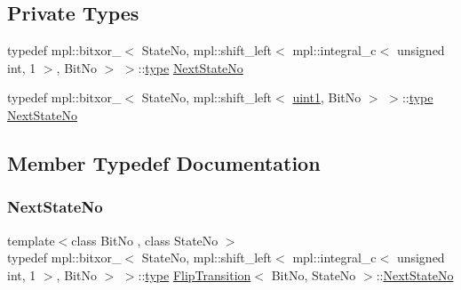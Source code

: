\subsection*{Private Types}
\begin{DoxyCompactItemize}
\item 
typedef mpl\+::bitxor\+\_\+$<$ State\+No, mpl\+::shift\+\_\+left$<$ mpl\+::integral\+\_\+c$<$ unsigned int, 1 $>$, Bit\+No $>$ $>$\+::\mbox{\hyperlink{struct_flip_transition_acb1fc32084f19c5bd106af2da39df89e}{type}} \mbox{\hyperlink{struct_flip_transition_a16b33cbdacbffc0e20e2ae9c76e8f645}{Next\+State\+No}}
\item 
typedef mpl\+::bitxor\+\_\+$<$ State\+No, mpl\+::shift\+\_\+left$<$ \mbox{\hyperlink{_performance_8cpp_afada4030cdd8c9628ca412e4409d07d1}{uint1}}, Bit\+No $>$ $>$\+::\mbox{\hyperlink{struct_flip_transition_acb1fc32084f19c5bd106af2da39df89e}{type}} \mbox{\hyperlink{struct_flip_transition_aa7e5237dbfee4dbe01006f5dfafc6229}{Next\+State\+No}}
\end{DoxyCompactItemize}


\subsection{Member Typedef Documentation}
\mbox{\label{struct_flip_transition_a16b33cbdacbffc0e20e2ae9c76e8f645}} 
\subsubsection{\texorpdfstring{Next\+State\+No}{NextStateNo}\hspace{0.1cm}{\footnotesize\ttfamily [1/2]}}
{\footnotesize\ttfamily template$<$class Bit\+No , class State\+No $>$ \\
typedef mpl\+::bitxor\+\_\+$<$ State\+No, mpl\+::shift\+\_\+left$<$ mpl\+::integral\+\_\+c$<$ unsigned int, 1 $>$, Bit\+No $>$ $>$\+::\mbox{\hyperlink{struct_flip_transition_acb1fc32084f19c5bd106af2da39df89e}{type}} \mbox{\hyperlink{struct_flip_transition}{Flip\+Transition}}$<$ Bit\+No, State\+No $>$\+::\mbox{\hyperlink{struct_flip_transition_a16b33cbdacbffc0e20e2ae9c76e8f645}{Next\+State\+No}}\hspace{0.3cm}{\ttfamily [private]}}

\mbox{\label{struct_flip_transition_aa7e5237dbfee4dbe01006f5dfafc6229}} 
